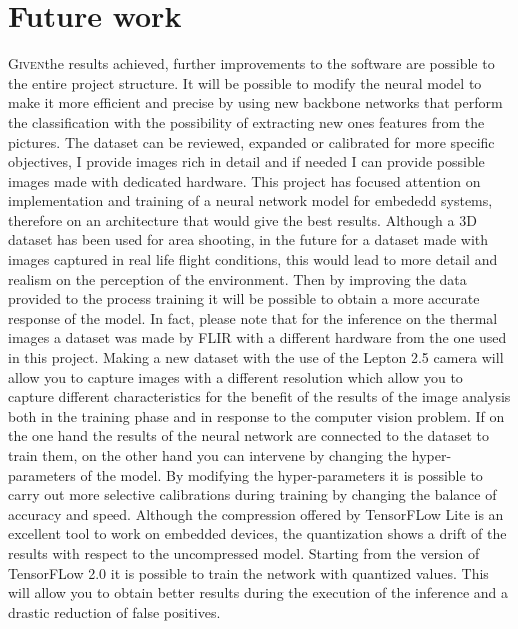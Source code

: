 \chapter{Future work}
\label{chap:future-work}
%
\lettrine[lines=3]{G}{iven}the results achieved, further improvements to the 
software are possible to the entire project structure. 
It will be possible to modify the neural model to make it more efficient and 
precise by using new backbone networks that perform the classification with the
possibility of extracting new ones features from the pictures. 
The dataset can be reviewed, expanded or calibrated for more specific
objectives, I provide images rich in detail and if needed I can provide possible
images made with dedicated hardware. 
This project has focused attention on implementation and training of a neural
network model for embededd systems, therefore on an architecture that would give
the best results. 
Although a 3D dataset has been used for area shooting, in the future for a
dataset made with images captured in real life flight conditions, this would
lead to more detail and realism on the perception of the environment. 
Then by improving the data provided to the process training it will be possible
to obtain a more accurate response of the model. 
In fact, please note that for the inference on the thermal images a dataset was
made by FLIR with a different hardware from the one used in this project. 
Making a new dataset with the use of the Lepton 2.5 camera will allow you to
capture images with a different resolution which allow you to capture
different characteristics for the benefit of the results of the image analysis
both in the training phase and in response to the computer vision problem. 
If on the one hand the results of the neural network are connected to the
dataset to train them, on the other hand you can intervene by changing the
hyper-parameters of the model. 
By modifying the hyper-parameters it is possible to carry out more selective
calibrations during training by changing the balance of accuracy and speed.
Although the compression offered by TensorFLow Lite is an excellent tool to work
on embedded devices, the quantization shows a drift of the results with respect
to the uncompressed model. Starting from the version of TensorFLow 2.0 it is
possible to train the network with quantized values. 
This will allow you to obtain better results during the execution of the
inference and a drastic reduction of false positives.